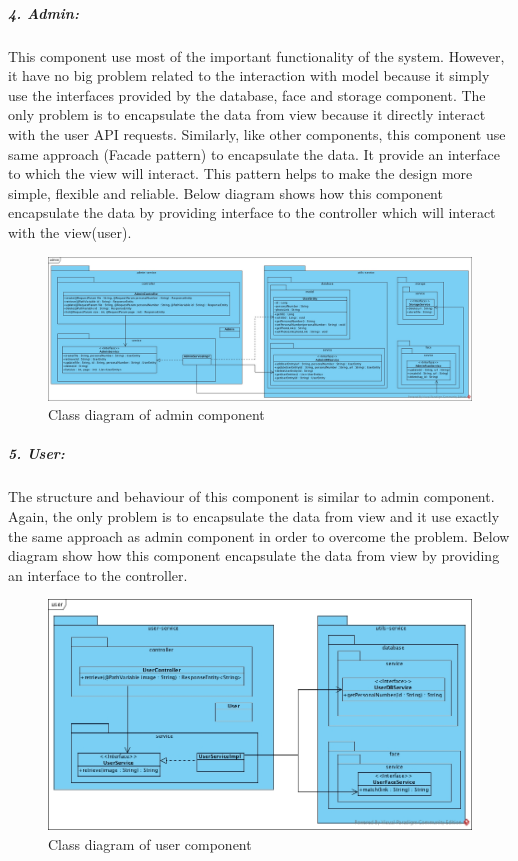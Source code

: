 \documentclass[a4paper,11pt]{article}
\begin{document}
\newpage
\subparagraph{4. Admin: }
This component use most of the important functionality of the system. However, it have no big problem related to the interaction with model because it simply use the interfaces provided by the database, face and storage component. The only problem is to encapsulate the data from view because it directly interact with the user API requests. Similarly, like other components, this component use same approach (Facade pattern) to encapsulate the data. It provide an interface to which the view will interact. This pattern helps to make the design more simple, flexible and reliable. Below diagram shows how this component encapsulate the data by providing interface to the controller which will interact with the view(user).

\begin{figure}[ht!]
    \centering
	\includegraphics[width=150mm]{ClassDiagrams/new/admin.jpg}
	\caption{Class diagram of admin component}
\end{figure}

\subparagraph{5. User: }The structure and behaviour of this component is similar to admin component. Again, the only problem is to encapsulate the data from view and it use exactly the same approach as admin component in order to overcome the problem. Below diagram show how this component encapsulate the data from view by providing an interface to the controller.

\begin{figure}[ht!]
    \centering
	\includegraphics[width=130mm]{ClassDiagrams/new/user.jpg}
	\caption{Class diagram of user component}
\end{figure}
\end{document}
